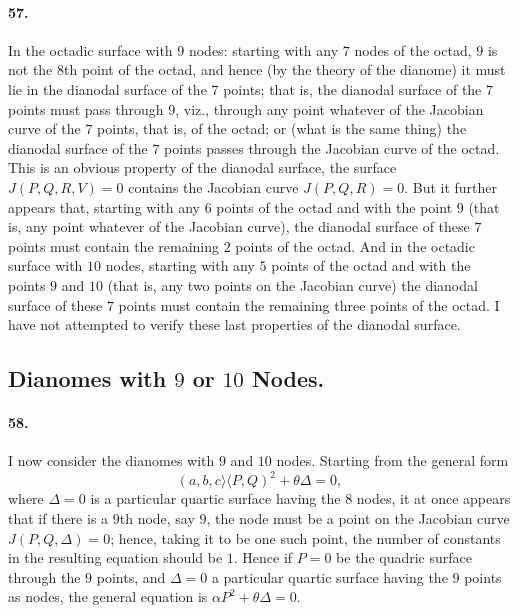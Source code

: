\documentclass[11pt,a4paper]{article}
\providecommand{\quant}{\mathrel{\rangle\!\langle}}
\begin{document}
\medskip

\paragraph{57.}
In the octadic surface with $9$ nodes: starting with any $7$ nodes of the octad,
$9$ is not the $8$th point of the octad, and hence (by the theory of the dianome)
it must lie in the dianodal surface of the $7$ points; that is, the dianodal surface
of the $7$ points must pass through $9$, viz., through any point whatever of the
Jacobian curve of the $7$ points, that is, of the octad; or (what is the same thing)
the dianodal surface of the $7$ points passes through the Jacobian curve of the
octad. This is an obvious property of the dianodal surface, the surface
$J(P, Q, R, V) = 0$ contains the Jacobian curve $J(P, Q, R) = 0$. But it further
appears that, starting with any $6$ points of the octad and with the point $9$
(that is, any point whatever of the Jacobian curve), the dianodal surface of these
$7$ points must contain the remaining $2$ points of the octad. And in the octadic
surface with $10$ nodes, starting with any $5$ points of the octad and with the
points $9$ and $10$ (that is, any two points on the Jacobian curve) the dianodal
surface of these $7$ points must contain the remaining three points of the octad.
I have not attempted to verify these last properties of the dianodal surface.

\bigskip

\subsection*{Dianomes with $9$ or $10$ Nodes.}

\paragraph{58.}
I now consider the dianomes with $9$ and $10$ nodes. Starting from the general form
\[
(a, b, c \quant P, Q)^2 + \theta \Delta = 0,
\]
where $\Delta = 0$ is a particular quartic surface having the $8$ nodes, it at once
appears that if there is a $9$th node, say $9$, the node must be a point on the
Jacobian curve $J(P, Q, \Delta) = 0$; hence, taking it to be one such point, the
number of constants in the resulting equation should be $1$. Hence if $P = 0$ be the
quadric surface through the $9$ points, and $\Delta = 0$ a particular quartic surface
having the $9$ points as nodes, the general equation is $\alpha P^2 + \theta \Delta = 0$.
\end{document}
